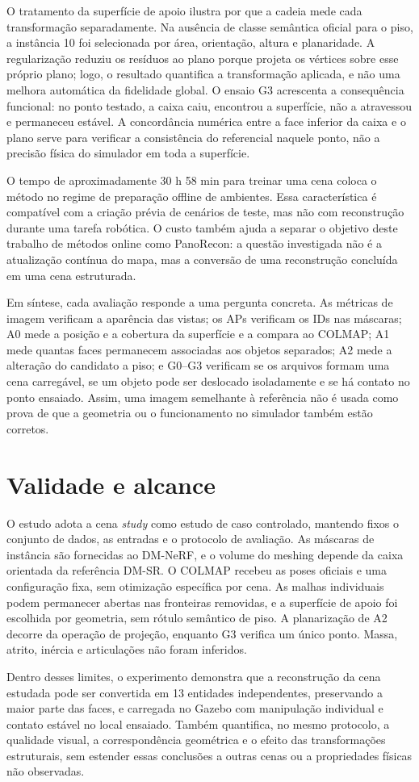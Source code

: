 O tratamento da superfície de apoio ilustra por que a cadeia mede cada transformação separadamente. Na ausência de classe semântica oficial para o piso, a instância 10 foi selecionada por área, orientação, altura e planaridade. A regularização reduziu os resíduos ao plano porque projeta os vértices sobre esse próprio plano; logo, o resultado quantifica a transformação aplicada, e não uma melhora automática da fidelidade global. O ensaio G3 acrescenta a consequência funcional: no ponto testado, a caixa caiu, encontrou a superfície, não a atravessou e permaneceu estável. A concordância numérica entre a face inferior da caixa e o plano serve para verificar a consistência do referencial naquele ponto, não a precisão física do simulador em toda a superfície.

O tempo de aproximadamente 30 h 58 min para treinar uma cena coloca o método no regime de preparação offline de ambientes. Essa característica é compatível com a criação prévia de cenários de teste, mas não com reconstrução durante uma tarefa robótica. O custo também ajuda a separar o objetivo deste trabalho de métodos online como PanoRecon: a questão investigada não é a atualização contínua do mapa, mas a conversão de uma reconstrução concluída em uma cena estruturada.

Em síntese, cada avaliação responde a uma pergunta concreta. As métricas de imagem verificam a aparência das vistas; os APs verificam os IDs nas máscaras; A0 mede a posição e a cobertura da superfície e a compara ao COLMAP; A1 mede quantas faces permanecem associadas aos objetos separados; A2 mede a alteração do candidato a piso; e G0--G3 verificam se os arquivos formam uma cena carregável, se um objeto pode ser deslocado isoladamente e se há contato no ponto ensaiado. Assim, uma imagem semelhante à referência não é usada como prova de que a geometria ou o funcionamento no simulador também estão corretos.

\section{Validade e alcance}

O estudo adota a cena \textit{study} como estudo de caso controlado, mantendo fixos o conjunto de dados, as entradas e o protocolo de avaliação. As máscaras de instância são fornecidas ao DM-NeRF, e o volume do meshing depende da caixa orientada da referência DM-SR. O COLMAP recebeu as poses oficiais e uma configuração fixa, sem otimização específica por cena. As malhas individuais podem permanecer abertas nas fronteiras removidas, e a superfície de apoio foi escolhida por geometria, sem rótulo semântico de piso. A planarização de A2 decorre da operação de projeção, enquanto G3 verifica um único ponto. Massa, atrito, inércia e articulações não foram inferidos.

Dentro desses limites, o experimento demonstra que a reconstrução da cena estudada pode ser convertida em 13 entidades independentes, preservando a maior parte das faces, e carregada no Gazebo com manipulação individual e contato estável no local ensaiado. Também quantifica, no mesmo protocolo, a qualidade visual, a correspondência geométrica e o efeito das transformações estruturais, sem estender essas conclusões a outras cenas ou a propriedades físicas não observadas.

